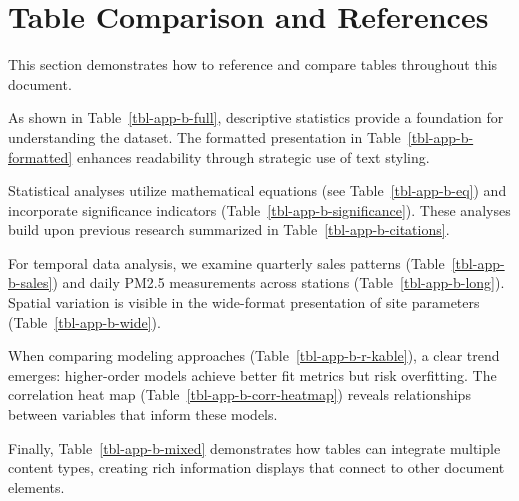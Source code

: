 \documentclass[
  letterpaper,
  oneside,
  openany]{MastersDoctoralThesis}
\begin{document}
\section{Table Comparison and
References}\label{sec-app-b-comparison-ref}

This section demonstrates how to reference and compare tables throughout
this document.

As shown in Table~\ref{tbl-app-b-full}, descriptive statistics provide a
foundation for understanding the dataset. The formatted presentation in
Table~\ref{tbl-app-b-formatted} enhances readability through strategic
use of text styling.

Statistical analyses utilize mathematical equations (see
Table~\ref{tbl-app-b-eq}) and incorporate significance indicators
(Table~\ref{tbl-app-b-significance}). These analyses build upon previous
research summarized in Table~\ref{tbl-app-b-citations}.

For temporal data analysis, we examine quarterly sales patterns
(Table~\ref{tbl-app-b-sales}) and daily PM2.5 measurements across
stations (Table~\ref{tbl-app-b-long}). Spatial variation is visible in
the wide-format presentation of site parameters
(Table~\ref{tbl-app-b-wide}).

When comparing modeling approaches (Table~\ref{tbl-app-b-r-kable}), a
clear trend emerges: higher-order models achieve better fit metrics but
risk overfitting. The correlation heat map
(Table~\ref{tbl-app-b-corr-heatmap}) reveals relationships between
variables that inform these models.

Finally, Table~\ref{tbl-app-b-mixed} demonstrates how tables can
integrate multiple content types, creating rich information displays
that connect to other document elements.
\end{document}
